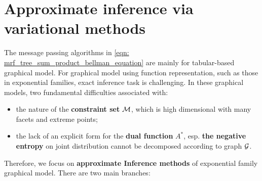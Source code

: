 \documentclass[11pt]{article}
\begin{document}
\section{Approximate inference via variational methods}
The message passing algorithms in \eqref{eqn: mrf_tree_sum_product_bellman_equation} are mainly for tabular-based graphical model. For graphical model using function representation, such as those in exponential families, exact inference task is challenging. In these graphical models, two fundamental difficulties associated with:
\begin{itemize}
\item the nature of the \textbf{constraint set} ${\mathcal M}$, which is high dimensional with many facets and extreme points; 

\item the lack of an explicit form for the \textbf{dual function} $A^{*}$, esp. \textbf{the negative entropy} on joint distribution cannot be decomposed according to graph ${\mathcal G}$.
\end{itemize} 
Therefore, we focus on \textbf{approximate Inference methods} of exponential family graphical model. There are two main branches:
\end{document}
